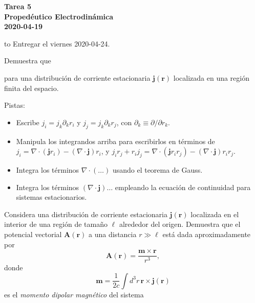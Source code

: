 \documentclass{exam}
\begin{document}
\begin{center}
  \bf\large Tarea 5\\
  Propedéutico Electrodinámica\\
  2020-04-19\\[20pt]
\end{center}
\hbox to \textwidth{Nombre: \enspace\hrulefill}
Entregar el viernes 2020-04-24.

\begin{questions}
\question Demuestra que
  para una distribución de corriente estacionaria $\bm j(\bm r)$
  localizada en una región finita del espacio.

  Pistas:
  \begin{itemize}
  \item Escribe $j_i=j_k\partial_k r_i$ y $j_j=j_k\partial_k r_j$, con
    $\partial_k\equiv\partial/\partial r_k$.
  \item Manipula los integrandos arriba para escribirlos en términos
    de $j_i=\nabla\cdot(\bm j r_i)-(\nabla\cdot\bm j)r_i$, y
    $j_i r_j+r_i j_j=\nabla\cdot(\bm j r_ir_j)-(\nabla\cdot\bm
    j)r_ir_j$.
  \item Integra los términos $\nabla\cdot(\ldots)$ usando el teorema de
    Gauss.
  \item Integra los términos $(\nabla\cdot\bm j)\ldots$ empleando la
    ecuación de continuidad para sistemas estacionarios.
  \end{itemize}

\question Considera una distribución de corriente estacionaria $\bm
  j(\bm r)$ localizada en el interior de una región de tamaño $\ell$ alrededor del
  origen. Demuestra que el potencial vectorial $\bm A(\bm r)$ a una
  distancia $r\gg \ell$ está dada aproximadamente por
  $$
  \bm A(\bm r)=\frac{\bm m\times\bm r}{r^3},
  $$
  donde
  $$
  \bm m=\frac{1}{2c}\int d^3r\, \bm r\times \bm j(\bm r)
  $$
  es el {\em momento dipolar magnético} del sistema


\end{questions}
\end{document}
